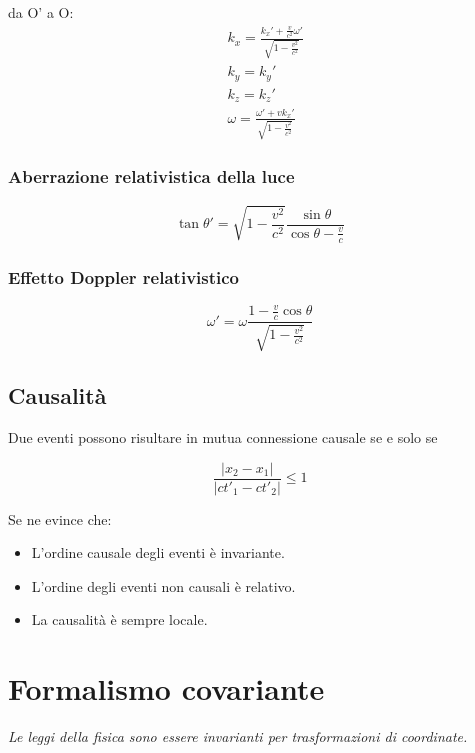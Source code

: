 \documentclass{article}
\begin{document}
da O' a O:
\begin{equation}
\begin{aligned}
    & k_x= \frac{k_x'+\frac{v}{c^2}\omega'}{\sqrt{1-\frac{v^2}{c^2}}} \\
    & k_y= k_y' \\
    & k_z= k_z' \\
    & \omega= \frac{\omega'+vk_x'}{\sqrt{1-\frac{v^2}{c^2}}}
\end{aligned}
\end{equation}

\subsubsection{Aberrazione relativistica della luce}
\begin{equation}
    \tan \theta' = \sqrt{1-\frac{v^2}{c^2}}\frac{\sin \theta}{\cos \theta - \frac{v}{c}}
\end{equation}

\subsubsection{Effetto Doppler relativistico}

\begin{equation}
\omega' = \omega\frac{1-\frac{v}{c}\cos{\theta}}{\sqrt{1-\frac{v^2}{c^2}}}
\end{equation}


\subsection{Causalità}
Due eventi possono risultare in mutua connessione causale se e solo se

\begin{equation}
   \frac{|x_2-x_1|}{|ct'_1-ct'_2|} \leq 1
\end{equation}

Se ne evince che:

\begin{itemize}
    \item L'ordine causale degli eventi è invariante.
    \item L'ordine degli eventi non causali è relativo.
    \item La causalità è sempre locale.
\end{itemize}

\section{Formalismo covariante}
\textit{
Le leggi della fisica sono essere invarianti per trasformazioni di coordinate.
}
\end{document}
